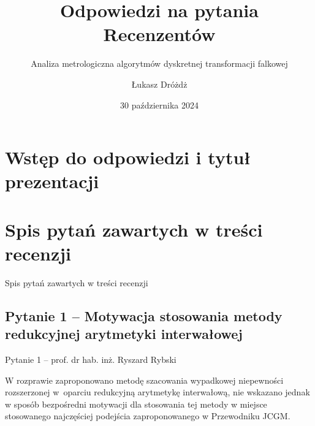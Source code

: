 \documentclass[12pt, polish, aspectratio = 169]{slides}
\title{Odpowiedzi na pytania Recenzentów}
\author{Łukasz Dróżdż}
\subtitle{Analiza metrologiczna algorytmów dyskretnej transformacji falkowej}
\institute{Politechnika Śląska, Wydział Elektryczny \\ Katedra Metrologii, Elektroniki i Automatyki}
\date{30 października 2024}
\begin{document}
\section*{Wstęp do odpowiedzi i tytuł prezentacji}

\begin{frame}[plain]
\titlepage
\end{frame}

\section*{Spis pytań zawartych w treści recenzji}

\begin{frame}{Spis pytań zawartych w treści recenzji}
\tableofcontents
\end{frame}


\subsection{Pytanie 1 -- Motywacja stosowania metody redukcyjnej arytmetyki interwałowej}

\begin{frame}{Pytanie 1 -- prof. dr hab. inż. Ryszard Rybski}\large
\begin{justify}
W rozprawie zaproponowano metodę szacowania wypadkowej niepewności rozszerzonej w oparciu redukcyjną arytmetykę interwałową, nie wskazano jednak w sposób bezpośredni motywacji dla stosowania tej metody w miejsce stosowanego najczęściej podejścia zaproponowanego w Przewodniku JCGM.
\end{justify}
\end{frame}
\end{document}
